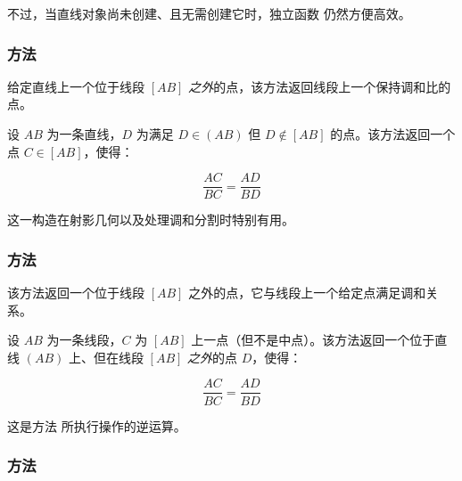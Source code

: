 \medskip

不过，当直线对象尚未创建、且无需创建它时，独立函数  仍然方便高效。


\subsubsection{方法 }
\label{ssub:method_line_harmonic_int}

给定直线上一个位于线段 $[AB]$ \emph{之外}的点，该方法返回线段上一个保持调和比的点。

\medskip

设 $AB$ 为一条直线，$D$ 为满足 $D \in (AB)$ 但 $D \not\in [AB]$ 的点。该方法返回一个点 $C \in [AB]$，使得：

\[
\frac{AC}{BC} = \frac{AD}{BD}
\]


这一构造在射影几何以及处理调和分割时特别有用。

\vspace{2em}
\begin{tkzexample}
\begin{center}
\end{center}

\end{tkzexample}

\subsubsection{方法 }
\label{ssub:method_line_harmonic_ext}
该方法返回一个位于线段 $[AB]$ 之外的点，它与线段上一个给定点满足调和关系。

\medskip

设 $AB$ 为一条线段，$C$ 为 $[AB]$ 上一点（但不是中点）。该方法返回一个位于直线 $(AB)$ 上、但在线段 $[AB]$ \emph{之外}的点 $D$，使得：

\[
\frac{AC}{BC} = \frac{AD}{BD}
\]


这是方法  所执行操作的逆运算。

\subsubsection{方法 }
\label{ssub:harmonic_both}

